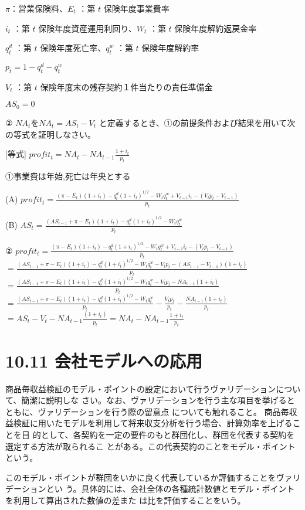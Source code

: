 \documentclass[report,gutter=10mm,fore-edge=10mm,uplatex,dvipdfmx]{jlreq}
\begin{document}
$\pi$：営業保険料、$E_t$ ：第 $t$ 保険年度事業費率

$i_t$ ：第 $t$ 保険年度資産運用利回り、$W_t$ ：第 $t$ 保険年度解約返戻金率

$q^d_t$ ：第 $t$ 保険年度死亡率、$q^w_t$ ：第 $t$ 保険年度解約率

$p_t = 1 - q^d_t - q^w_t$

$V_t$ ：第 $t$ 保険年度末の残存契約１件当たりの責任準備金

$AS_0=0$

② $NA_t$を$NA_t=AS_t-V_t$ と定義するとき、①の前提条件および結果を用いて次の等式を証明しなさい。

[等式]
$profit_t=NA_t-NA_{t-1}\frac{1+i_t}{p_t}$

\answer{}

①事業費は年始,死亡は年央とする

(A) $profit_t=\frac{(\pi-E_t)(1+i_t)-q^d_t(1+i_t)^{1/2}-W_tq_t^w+V_{t-1}i_t-(V_tp_t-V_{t-1})}{p_t}$

(B) $AS_t = \frac{(AS_{t-1}+\pi-E_t)(1+i_t)-q^d_t(1+i_t)^{1/2}-W_tq^w_t}{p_t}$

②
$profit_t=\frac{(\pi-E_t)(1+i_t)-q^d_t(1+i_t)^{1/2}-W_tq_t^w+V_{t-1}i_t-(V_tp_t-V_{t-1})}{p_t}$\\
$= \frac{(AS_{t-1}+\pi-E_t)(1+i_t)-q^d_t(1+i_t)^{1/2}-W_tq_t^w-V_tp_t-(AS_{t-1}-V_{t-1})(1+i_t)}{p_t}$\\
$= \frac{(AS_{t-1}+\pi-E_t)(1+i_t)-q^d_t(1+i_t)^{1/2}-W_tq_t^w-V_tp_t-NA_{t-1}(1+i_t)}{p_t}$\\
$= \frac{(AS_{t-1}+\pi-E_t)(1+i_t)-q^d_t(1+i_t)^{1/2}-W_tq_t^w}{p_t}-\frac{V_tp_t}{p_t}-\frac{NA_{t-1}(1+i_t)}{p_t}$\\
$= AS_t-V_t-NA_{t-1}\frac{(1+i_t)}{p_t} = NA_t - NA_{t-1}\frac{1+i_t}{p_t}$


\section{10.11 会社モデルへの応用}

商品毎収益検証のモデル・ポイントの設定において行うヴァリデーションについて、簡潔に説明しな
さい。なお、ヴァリデーションを行う主な項目を挙げるとともに、ヴァリデーションを行う際の留意点
についても触れること。
\answer{}
商品毎収益検証に用いたモデルを利用して将来収支分析を行う場合、計算効率を上げることを目
的として、各契約を一定の要件のもと群団化し、群団を代表する契約を選定する方法が取られるこ
とがある。この代表契約のことをモデル・ポイントという。

このモデル・ポイントが群団をいかに良く代表しているか評価することをヴァリデーションとい
う。具体的には、会社全体の各種統計数値とモデル・ポイントを利用して算出された数値の差また
は比を評価することをいう。
\end{document}
